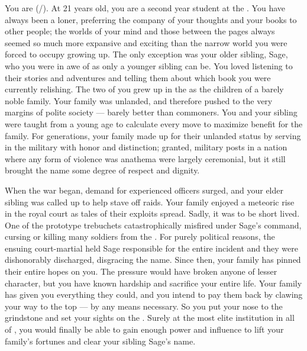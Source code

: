 \documentclass[char]{GL2020}
\begin{document}
\name{\cLibAssist{}}

You are \cLibAssist{\full} (\cLibAssist{\they}/\cLibAssist{\them}). At 21 years old, you are a second year student at the \pSchool{}. You have always been a loner, preferring the company of your thoughts and your books to other people; the worlds of your mind and those between the pages always seemed so much more expansive and exciting than the narrow world you were forced to occupy growing up. The only exception was your older sibling, Sage, who you were in awe of as only a younger sibling can be. You loved listening to their stories and adventures and telling them about which book you were currently relishing. The two of you grew up in the \pFarm{} as the children of a barely noble family. Your family was unlanded, and therefore pushed to the very margins of polite society — barely better than commoners. You and your sibling were taught from a young age to calculate every move to maximize benefit for the family. For generations, your family made up for their unlanded status by serving in the military with honor and distinction; granted, military posts in a nation where any form of violence was anathema were largely ceremonial, but it still brought the \cLibAssist{\formal} name some degree of respect and dignity. 

When the war began, demand for experienced officers surged, and your elder sibling was called up to help stave off \pShippie{} raids. Your family enjoyed a meteoric rise in the royal court as tales of their exploits spread. Sadly, it was to be short lived. One of the prototype trebuchets catastrophically misfired under Sage’s command, cursing or killing many soldiers from the \pTech{}. For purely political reasons, the ensuing court-martial held Sage responsible for the entire incident and they were dishonorably discharged, disgracing the \cLibAssist{\formal} name. Since then, your family has pinned their entire hopes on you. The pressure would have broken anyone of lesser character, but you have known hardship and sacrifice your entire life. Your family has given you everything they could, and you intend to pay them back by clawing your way to the top — by any means necessary. So you put your nose to the grindstone and set your sights on the \pSchool{}. Surely at the most elite institution in all of \pEarth{}, you would finally be able to gain enough power and influence to lift your family’s fortunes and clear your sibling Sage’s name.
\end{document}
